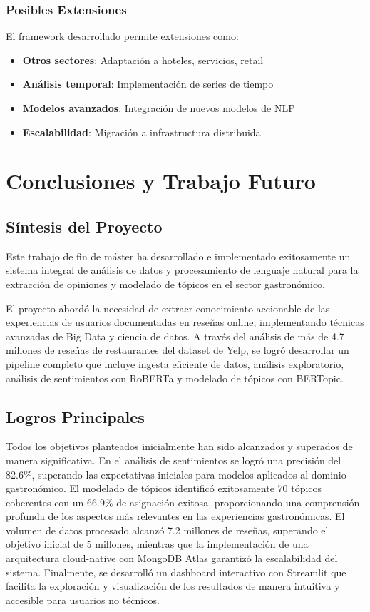 \documentclass[12pt,a4paper,twoside,openany]{book}
\begin{document}
\subsection{Posibles Extensiones}

El framework desarrollado permite extensiones como:

\begin{itemize}
    \item \textbf{Otros sectores}: Adaptación a hoteles, servicios, retail
    \item \textbf{Análisis temporal}: Implementación de series de tiempo
    \item \textbf{Modelos avanzados}: Integración de nuevos modelos de NLP
    \item \textbf{Escalabilidad}: Migración a infrastructura distribuida
\end{itemize}

\chapter{Conclusiones y Trabajo Futuro}

\section{Síntesis del Proyecto}

Este trabajo de fin de máster ha desarrollado e implementado exitosamente un sistema integral de análisis de datos y procesamiento de lenguaje natural para la extracción de opiniones y modelado de tópicos en el sector gastronómico.

El proyecto abordó la necesidad de extraer conocimiento accionable de las experiencias de usuarios documentadas en reseñas online, implementando técnicas avanzadas de Big Data y ciencia de datos. A través del análisis de más de 4.7 millones de reseñas de restaurantes del dataset de Yelp, se logró desarrollar un pipeline completo que incluye ingesta eficiente de datos, análisis exploratorio, análisis de sentimientos con RoBERTa y modelado de tópicos con BERTopic.

\section{Logros Principales}

Todos los objetivos planteados inicialmente han sido alcanzados y superados de manera significativa. En el análisis de sentimientos se logró una precisión del 82.6\%, superando las expectativas iniciales para modelos aplicados al dominio gastronómico. El modelado de tópicos identificó exitosamente 70 tópicos coherentes con un 66.9\% de asignación exitosa, proporcionando una comprensión profunda de los aspectos más relevantes en las experiencias gastronómicas. El volumen de datos procesado alcanzó 7.2 millones de reseñas, superando el objetivo inicial de 5 millones, mientras que la implementación de una arquitectura cloud-native con MongoDB Atlas garantizó la escalabilidad del sistema. Finalmente, se desarrolló un dashboard interactivo con Streamlit que facilita la exploración y visualización de los resultados de manera intuitiva y accesible para usuarios no técnicos.
\end{document}
